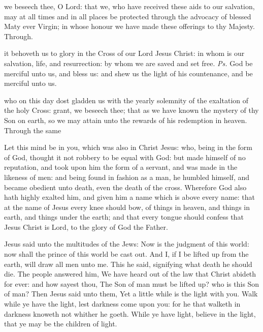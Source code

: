 
\postcommunion
{} we beseech thee, O Lord: that we, who have received these aids to our salvation, may at all times and in all places be protected through the advocacy of blessed Maty ever Virgin; in whose honour we have made these offerings to thy Majesty. Through.



\introit
{} it behoveth us to glory in the Cross of our Lord Jesus Christ: in whom is our salvation, life, and resurrection: by whom we are saved and set free. \textit{Ps.} God be merciful unto us, and bless us: and shew us the light of his countenance, and be merciful unto us.

\collect
{} who on this day dost gladden us with the yearly solemnity of the exaltation of the holy Cross: grant, we beseech thee; that as we have known the mystery of thy Son on earth, so we may attain unto the rewards of his redemption in heaven. Through the same

 Let this mind be in you, which was also in Christ Jesus: who, being in the form of God, thought it not robbery to be equal with God: but made himself of no reputation, and took upon him the form of a servant, and was made in the likeness of men: and being found in fashion as a man, he humbled himself, and became obedient unto death, even the death of the cross. Wherefore God also hath highly exalted him, and given him a name which is above every name:  that at the name of Jesus every knee should bow, of things in heaven, and things in earth, and things under the earth; and that every tongue should confess that Jesus Christ is Lord, to the glory of God the Father.



 Jesus said unto the multitudes of the Jews: Now is the judgment of this world: now shall the prince of this world be cast out. And I, if I be lifted up from the earth, will draw all men unto me. This he said, signifying what death he should die. The people answered him, We have heard out of the law that Christ abideth for ever: and how sayest thou, The Son of man must be lifted up? who is this Son of man? Then Jesus said unto them, Yet a little while is the light with you. Walk while ye have the light, lest darkness come upon you: for he that walketh in darkness knoweth not whither he goeth. While ye have light, believe in the light, that ye may be the children of light.

